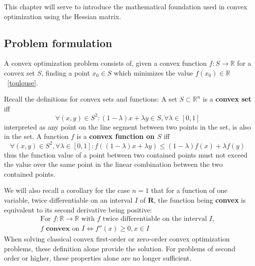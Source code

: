 \documentclass[../convex_optimization.tex]{subfiles}
\theoremstyle{definition} \newtheorem{defi}{Def}
\theoremstyle{definition} \newtheorem{prop}{Prop}
\begin{document}
This chapter will serve to introduce the mathematical foundation used in
convex optimization using the Hessian matrix.

\subsection{Problem formulation}
A convex optimization problem consists of, given a convex function
$f: S \to \mathbb R$ for a convex set $S$, finding
a point $x_0 \in S$ which minimizes the value $f(x_0) \in \mathbb R$~\ref{toulouse}.

Recall the definitions for convex sets and functions:
A set $S \subset \mathbb R^n$ is a \textbf{convex set} iff
\begin{equation}
    \forall (x, y) \in S^2: (1-\lambda)x + \lambda y \in S,
    \forall \lambda \in [0, 1]
    \label{convex_set}
\end{equation}
interpreted as any point on the line segment between two points in the set,
is also in the set.
A function $f$ is a \textbf{convex function on $S$} iff
\begin{equation}
    \forall (x, y) \in S^2, \forall \lambda \in [0, 1]:
    f((1-\lambda)x + \lambda y) \leq (1-\lambda)f(x) + \lambda f(y)
    \label{convex_function}
\end{equation}
thus the function value of a point between two contained points must
not exceed the value over the same point in the linear combination between the two contained points.

We will also recall a corollary for the case $n=1$ 
that for a function of one variable,
twice differentiable on an interval $I$ of $\mathbf R$,
the function being \textbf{convex} is equivalent to its second derivative
being positive:
\begin{equation} \label{convex_corollary}
\begin{gathered}
    \text{For } f: \mathbb R \to \mathbb R
    \text{ with $f$ twice differentiable on the interval $I$}, \\
f \textbf{ convex}\text{ on } I \iff f''(x) \geq 0, x \in I
\end{gathered}
\end{equation}
When solving classical convex first-order or zero-order convex
optimization problems, these definition alone provide the solution.
For problems of second order or higher, these properties alone are
no longer sufficient.
\end{document}
